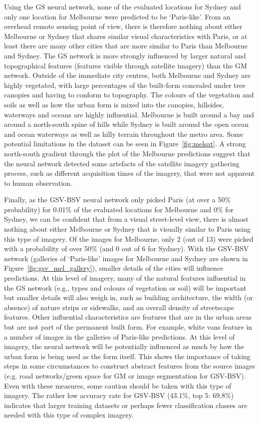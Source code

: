 \documentclass[urbansci,article,submit,moreauthors,pdftex]{Definitions/mdpi}
\begin{document}
Using the GS neural network, none of the evaluated locations for Sydney and only one location for Melbourne were predicted to be `Paris-like'. From an overhead remote sensing point of view, there is therefore nothing about either Melbourne or Sydney that shares similar visual characteristics with Paris, or at least there are many other cities that are more similar to Paris than Melbourne and Sydney. The GS network is more strongly influenced by larger natural and topographical features (features visible through satellite imagery) than the GM network. Outside of the immediate city centres, both Melbourne and Sydney are highly vegetated, with large percentages of the built-form concealed under tree canopies and having to conform to topography. The colours of the vegetation and soils as well as how the urban form is mixed into the canopies, hillsides, waterways and oceans are highly influential. Melbourne is built around a bay and around a north-south spine of hills while Sydney is built around the open ocean and ocean waterways as well as hilly terrain throughout the metro area. Some potential limitations in the dataset can be seen in Figure~\ref{fig:melsat}. A strong north-south gradient through the plot of the Melbourne predictions suggest that the neural network detected some artefacts of the satellite imagery gathering process, such as different acquisition times of the imagery, that were not apparent to human observation. 

Finally, as the GSV-BSV neural network only picked Paris (at over a 50\% probability) for 0.01\% of the evaluated locations for Melbourne and 0\% for Sydney, we can be confident that from a visual street-level view, there is almost nothing about either Melbourne or Sydney that is visually similar to Paris using this type of imagery. Of the images for Melbourne, only 2 (out of 13) were picked with a probability of over 50\% (and 0 out of 6 for Sydney). With the GSV-BSV network (galleries of `Paris-like' images for Melbourne and Sydney are shown in Figure~\ref{fig:gsv_mel_gallery}), smaller details of the cities will influence predictions. At this level of imagery, many of the natural features influential in the GS network (e.g., types and colours of vegetation or soil) will be important but smaller details will also weigh in, such as building architecture, the width (or absence) of nature strips or sidewalks, and an overall density of streetscape features. Other influential characteristics are features that are in the urban areas but are not part of the permanent built form. For example, white vans feature in a number of images in the galleries of Paris-like predictions. At this level of imagery, the neural network will be potentially influenced as much by how the urban form is being used as the form itself. This shows the importance of taking steps in some circumstances to construct abstract features from the source images (e.g. road networks/green space for GM or image segmentation for GSV-BSV). Even with these measures, some caution should be taken with this type of imagery. The rather low accuracy rate for GSV-BSV (43.1\%, top 5: 69.8\%) indicates that larger training datasets or perhaps fewer classification classes are needed with this type of complex imagery.
\end{document}
